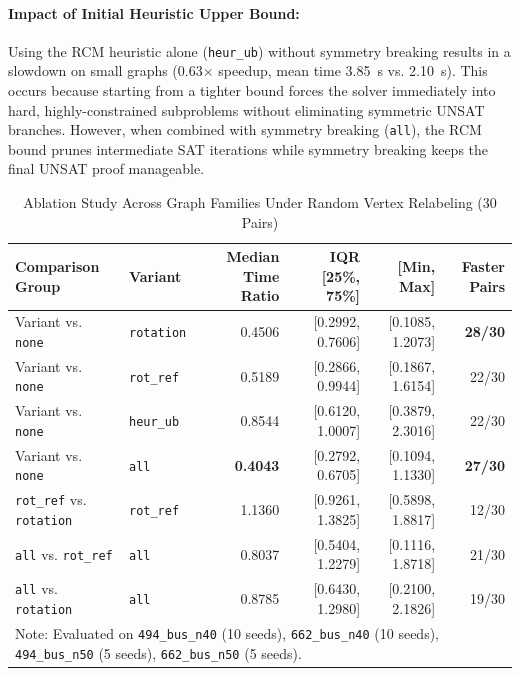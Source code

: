 \documentclass[a4paper,fleqn]{cas-sc}
\begin{document}
\paragraph{Impact of Initial Heuristic Upper Bound:}
Using the RCM heuristic alone (\texttt{heur\_ub}) without symmetry breaking results in a slowdown on small graphs (0.63$\times$ speedup, mean time 3.85~s vs. 2.10~s). This occurs because starting from a tighter bound forces the solver immediately into hard, highly-constrained subproblems without eliminating symmetric UNSAT branches. However, when combined with symmetry breaking (\texttt{all}), the RCM bound prunes intermediate SAT iterations while symmetry breaking keeps the final UNSAT proof manageable.

\begin{table}
\centering
\caption{Ablation Study Across Graph Families Under Random Vertex Relabeling (30 Pairs)}
\label{tab:table_ablation_family}
\begin{tabular}{llrrrr}
\toprule
Comparison Group & Variant & Median Time Ratio & IQR [25\%, 75\%] & [Min, Max] & Faster Pairs \\
\midrule
Variant vs. \texttt{none} & \texttt{rotation} & 0.4506 & [0.2992, 0.7606] & [0.1085, 1.2073] & \textbf{28/30} \\
Variant vs. \texttt{none} & \texttt{rot\_ref} & 0.5189 & [0.2866, 0.9944] & [0.1867, 1.6154] & 22/30 \\
Variant vs. \texttt{none} & \texttt{heur\_ub} & 0.8544 & [0.6120, 1.0007] & [0.3879, 2.3016] & 22/30 \\
Variant vs. \texttt{none} & \texttt{all} & \textbf{0.4043} & [0.2792, 0.6705] & [0.1094, 1.1330] & \textbf{27/30} \\
\midrule
\texttt{rot\_ref} vs. \texttt{rotation} & \texttt{rot\_ref} & 1.1360 & [0.9261, 1.3825] & [0.5898, 1.8817] & 12/30 \\
\texttt{all} vs. \texttt{rot\_ref} & \texttt{all} & 0.8037 & [0.5404, 1.2279] & [0.1116, 1.8718] & 21/30 \\
\texttt{all} vs. \texttt{rotation} & \texttt{all} & 0.8785 & [0.6430, 1.2980] & [0.2100, 2.1826] & 19/30 \\
\bottomrule
\multicolumn{6}{l}{\footnotesize Note: Evaluated on \texttt{494\_bus\_n40} (10 seeds), \texttt{662\_bus\_n40} (10 seeds), \texttt{494\_bus\_n50} (5 seeds), \texttt{662\_bus\_n50} (5 seeds).} \\
\end{tabular}
\end{table}
\end{document}
